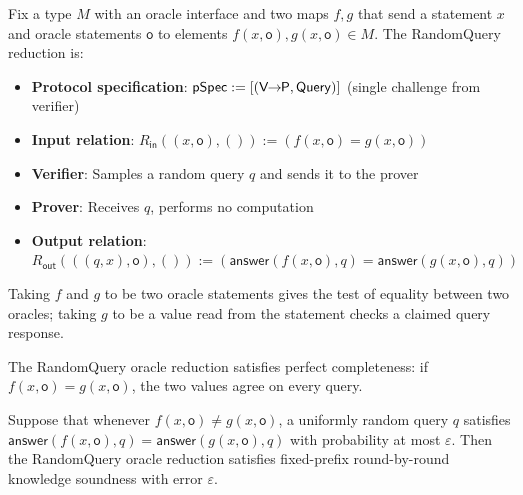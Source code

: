 \begin{definition}
    \label{def:randomquery_oracle_reduction}
    Fix a type $M$ with an oracle interface and two maps $f, g$ that send a statement $x$ and oracle statements $\mathsf{o}$ to elements $f(x, \mathsf{o}), g(x, \mathsf{o}) \in M$. The RandomQuery reduction is:
    \begin{itemize}
        \item \textbf{Protocol specification}: $\mathsf{pSpec} := [(\mathsf{V \!\!\rightarrow\!\! P}, \mathsf{Query})]$ (single challenge from verifier)
        \item \textbf{Input relation}: $R_{\mathsf{in}}((x, \mathsf{o}), ()) := (f(x, \mathsf{o}) = g(x, \mathsf{o}))$
        \item \textbf{Verifier}: Samples a random query $q$ and sends it to the prover
        \item \textbf{Prover}: Receives $q$, performs no computation
        \item \textbf{Output relation}: $R_{\mathsf{out}}(((q, x), \mathsf{o}), ()) := (\mathsf{answer}(f(x, \mathsf{o}), q) = \mathsf{answer}(g(x, \mathsf{o}), q))$
    \end{itemize}
    Taking $f$ and $g$ to be two oracle statements gives the test of equality between two oracles; taking $g$ to be a value read from the statement checks a claimed query response.
    \leanok
\end{definition}

\begin{theorem}
    The RandomQuery oracle reduction satisfies perfect completeness: if $f(x, \mathsf{o}) = g(x, \mathsf{o})$, the two values agree on every query.
    \leanok
\end{theorem}

\begin{theorem}
    Suppose that whenever $f(x, \mathsf{o}) \neq g(x, \mathsf{o})$, a uniformly random query $q$ satisfies $\mathsf{answer}(f(x, \mathsf{o}), q) = \mathsf{answer}(g(x, \mathsf{o}), q)$ with probability at most $\varepsilon$. Then the RandomQuery oracle reduction satisfies fixed-prefix round-by-round knowledge soundness with error $\varepsilon$.
    \leanok
\end{theorem}

